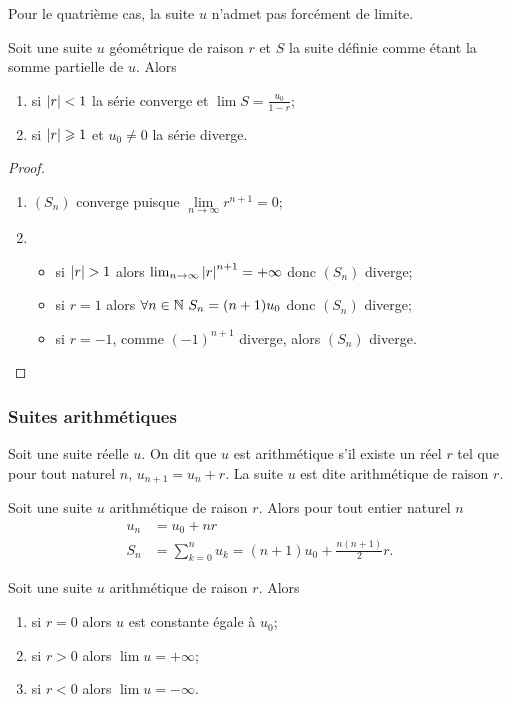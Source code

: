 Pour le quatrième cas, la suite \(u\) n'admet pas forcément de limite.
\begin{prop}
  Soit une suite \(u\) géométrique de raison \(r\) et \(S\) la suite définie comme étant la somme partielle de \(u\). Alors
  \begin{enumerate}
  \item si \(\left\lvert r\right\rvert < 1\) la série converge et \(\lim S = \frac{u_0}{1-r}\);
  \item si \(\left\lvert r\right\rvert \geqslant 1\) et \(u_0 \neq 0\) la série diverge.
  \end{enumerate}
\end{prop}
\begin{proof}
  \begin{enumerate}
  \item \((S_n)\) converge puisque \(\lim\limits_{n \to \infty} r^{n+1} = 0\);
  \item 
    \begin{itemize} 
    \item si \(\left\lvert r\right\rvert>1\) alors \(\lim_{n \to \infty} \left\lvert r\right\rvert^{n+1} = +\infty\) donc \((S_n)\) diverge;
    \item si \(r = 1\) alors \(\forall n \in \mathbb{N} \ S_n = (n+1)u_0\) donc \((S_n)\) diverge;
    \item si \(r = -1\), comme \((-1)^{n+1}\) diverge, alors \((S_n)\) diverge.
    \end{itemize}
  \end{enumerate}
\end{proof}

\subsubsection{Suites arithmétiques}

\begin{defdef}
  Soit une suite réelle \(u\). On dit que \(u\) est arithmétique s'il existe un réel \(r\) tel que pour tout naturel \(n\), \(u_{n+1} = u_n +r\). La suite \(u\) est dite arithmétique de raison \(r\).
\end{defdef}
\begin{prop}
  Soit une suite \(u\) arithmétique de raison \(r\). Alors pour tout entier naturel \(n\)
  \begin{align}
      u_n &= u_0+nr \\
      S_n &=\sum_{k = 0}^n u_k = (n+1)u_0 + \frac{n(n+1)}{2}r.
  \end{align}
\end{prop}
\begin{prop}
  Soit une suite \(u\) arithmétique de raison \(r\). Alors
  \begin{enumerate}
  \item si \(r = 0\) alors \(u\) est constante égale à \(u_0\);
  \item si \(r>0\) alors \(\lim u =+\infty\);
  \item si \(r<0\) alors \(\lim u =-\infty\).
  \end{enumerate}
\end{prop}

